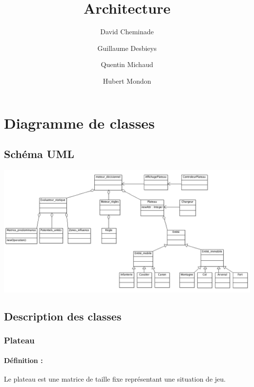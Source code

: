 \documentclass[12pt]{article}
\begin{document}
 
	\title{Architecture}             
	\author{
		David Cheminade
		\and
		Guillaume Desbieys
		\and
		Quentin Michaud
		\and
		Hubert Mondon
	}                       
	\date{}
	\maketitle{}                

	\let\thefootnote\relax

	\section{Diagramme de classes}    

		\subsection{Schéma UML}

			\includegraphics[scale=0.4]{images/diag_classes.png}

			\clearpage

		\subsection{Description des classes}

			\subsubsection*{Plateau}
			
				\paragraph{Définition :}

				Le plateau est une matrice de taille fixe représentant une situation de jeu.
\end{document}
